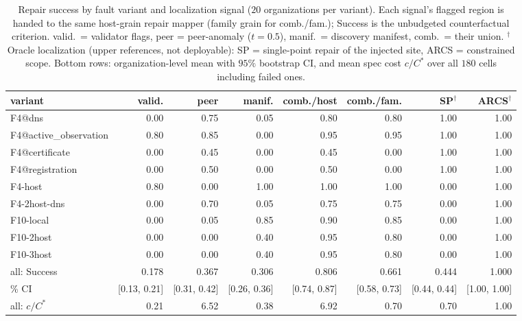 \begin{table}[t]\centering\footnotesize\setlength{\tabcolsep}{4pt}
\caption{Repair success by fault variant and localization signal ($20$ organizations per variant). Each signal's flagged region is handed to the same host-grain repair mapper (family grain for comb./fam.); Success is the unbudgeted counterfactual criterion. valid.\ = validator flags, peer = peer-anomaly ($t=0.5$), manif.\ = discovery manifest, comb.\ = their union. $^\dagger$Oracle localization (upper references, not deployable): SP = single-point repair of the injected site, ARCS = constrained scope. Bottom rows: organization-level mean with $95\%$ bootstrap CI, and mean spec cost $c/C^\ast$ over all $180$ cells including failed ones.}
\label{tab:ed-matrix}
\begin{tabular}{lrrrrrrr}\toprule
variant & valid. & peer & manif. & comb./host & comb./fam. & SP$^\dagger$ & ARCS$^\dagger$\\\midrule
F4@dns & 0.00 & 0.75 & 0.05 & 0.80 & 0.80 & 1.00 & 1.00\\
F4@active\_observation & 0.80 & 0.85 & 0.00 & 0.95 & 0.95 & 1.00 & 1.00\\
F4@certificate & 0.00 & 0.45 & 0.00 & 0.45 & 0.00 & 1.00 & 1.00\\
F4@registration & 0.00 & 0.50 & 0.00 & 0.50 & 0.00 & 1.00 & 1.00\\
F4-host & 0.80 & 0.00 & 1.00 & 1.00 & 1.00 & 0.00 & 1.00\\
F4-2host-dns & 0.00 & 0.70 & 0.05 & 0.75 & 0.75 & 0.00 & 1.00\\
F10-local & 0.00 & 0.05 & 0.85 & 0.90 & 0.85 & 0.00 & 1.00\\
F10-2host & 0.00 & 0.00 & 0.40 & 0.95 & 0.80 & 0.00 & 1.00\\
F10-3host & 0.00 & 0.00 & 0.40 & 0.95 & 0.80 & 0.00 & 1.00\\
\midrule
all: Success & 0.178 & 0.367 & 0.306 & 0.806 & 0.661 & 0.444 & 1.000\\
\quad 95\% CI & [0.13, 0.21] & [0.31, 0.42] & [0.26, 0.36] & [0.74, 0.87] & [0.58, 0.73] & [0.44, 0.44] & [1.00, 1.00]\\
all: $c/C^\ast$ & 0.21 & 6.52 & 0.38 & 6.92 & 0.70 & 0.70 & 1.00\\
\bottomrule\end{tabular}\end{table}

